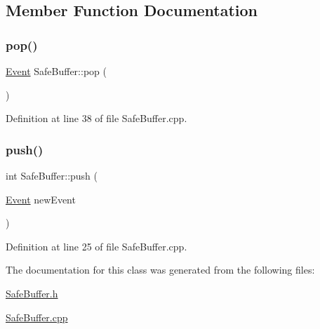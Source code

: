 \subsection{Member Function Documentation}
\mbox{\label{class_safe_buffer_a90a33fca4d838f7c0eef6e8557f3c281}} 
\subsubsection{\texorpdfstring{pop()}{pop()}}
{\footnotesize\ttfamily \hyperlink{class_event}{Event} Safe\+Buffer\+::pop (\begin{DoxyParamCaption}{ }\end{DoxyParamCaption})}



Definition at line 38 of file Safe\+Buffer.\+cpp.

\mbox{\label{class_safe_buffer_ac3ed0799ec2e84c97e36b22c83f7abf5}} 
\subsubsection{\texorpdfstring{push()}{push()}}
{\footnotesize\ttfamily int Safe\+Buffer\+::push (\begin{DoxyParamCaption}\item[{\hyperlink{class_event}{Event}}]{new\+Event }\end{DoxyParamCaption})}



Definition at line 25 of file Safe\+Buffer.\+cpp.



The documentation for this class was generated from the following files\+:\begin{DoxyCompactItemize}
\item 
\hyperlink{_safe_buffer_8h}{Safe\+Buffer.\+h}\item 
\hyperlink{_safe_buffer_8cpp}{Safe\+Buffer.\+cpp}\end{DoxyCompactItemize}
